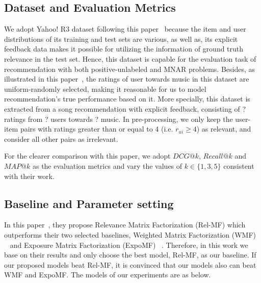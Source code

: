 \documentclass[sigconf]{acmart}
\begin{document}
\subsection{Dataset and Evaluation Metrics}
We adopt Yahoo! R3 dataset following this paper~\cite{saito2020unbiased} because the item and user distributions of its training and test sets are various, as well as, its explicit feedback data makes it possible for utilizing the information of ground truth relevance in the test set. Hence, this dataset is capable for the evaluation task of recommendation with both positive-unlabeled and MNAR problems. Besides, as illustrated in this paper~\cite{yang2018unbiased}, the ratings of user towards music in this dataset are uniform-randomly selected, making it reasonable for us to model recommendation's true performance based on it.
More specially, this dataset is extracted from a song recommendation with explicit feedback, consisting of ? ratings
from ? users towards ? music. In pre-processing, we only keep the user-item pairs with ratings greater than or equal to 4 (i.e. $r_{ui} \geq 4$) as relevant, and consider all other pairs as irrelevant. 

For the clearer comparison with this paper\cite{saito2020unbiased}, we adopt $DCG@k$, $Recall@k$ and $MAP@k$ as the evaluation metrics and vary the values of $k \in \{1, 3, 5\}$ consistent with their work. 

\subsection{Baseline and Parameter setting}
In this paper~\cite{saito2020unbiased}, they propose Relevance Matrix Factorization (Rel-MF) which outperforms their two selected baselines, Weighted Matrix Factorization (WMF) ~\cite{hu2008collaborative} and Exposure Matrix Factorization (ExpoMF)~\cite{liang2016modeling} . Therefore, in this work we base on their results and only choose the best model, Rel-MF, as our baseline. If our proposed models beat Rel-MF, it is convinced that our models also can beat WMF and ExpoMF. The models of our experiments are as below.
\end{document}
